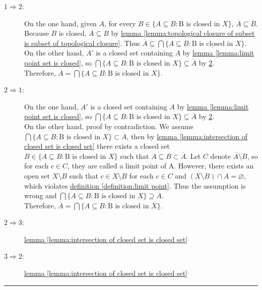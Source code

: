 \documentclass[12pt]{article}
\numberwithin{equation}{section}
\theoremstyle{plain} %
\theoremstyle{definition}
\theoremstyle{remark}
\newenvironment{proof}{{\bf Proof:}}{\hfill\rule{2mm}{2mm}}
\begin{document}
\begin{proof}
\begin{description}
	\item[$1 \Rightarrow 2$:] On the one hand, given $A$, for every $B \in \{A \subseteq B: \text{B is closed in }X\}$, $\overline{A} \subseteq \overline{B}$. Because $B$ is closed, $\overline{A} \subseteq {B}$ by \hyperref[lemma:topological closure of subset is subset of topological closure]{lemma \ref*{lemma:topological closure of subset is subset of topological closure}}. Thus $\overline{A} \subseteq \bigcap \{A \subseteq B: \text{B is closed in }X\}$. \\
	On the other hand, $A'$ is a closed set containing $A$ by \hyperref[lemma:limit point set is closed]{lemma \ref*{lemma:limit point set is closed}}, so $\bigcap \{A \subseteq B: \text{B is closed in }X\} \subseteq \overline{A}$ by \hyperref[definition:closure 2]{2}. \\
	Therefore, $\overline{A} = \bigcap \{A \subseteq B: \text{B is closed in }X\}$. 
	\item[$2 \Rightarrow 1$:] On the one hand, $A'$ is a closed set containing $A$ by \hyperref[lemma:limit point set is closed]{lemma \ref*{lemma:limit point set is closed}}, so $\bigcap \{A \subseteq B: \text{B is closed in }X\} \subseteq \overline{A}$ by \hyperref[definition:closure 2]{2}. \\
	On the other hand, proof by contradiction. We assume $\bigcap \{A \subseteq B: \text{B is closed in }X\} \subset \overline{A}$, then by \hyperref[lemma:intersection of closed set is closed set]{lemma \ref*{lemma:intersection of closed set is closed set}} there exists a closed set $B \in \{A \subseteq B: \text{B is closed in }X\}$ such that $A \subseteq B \subset \overline{A}$. Let $C$ denote $\overline{A} \setminus B$, so for each $c \in C$, they are called a limit point of A. However, there exists an open set $X \setminus B$ such that $c \in X \setminus B$ for each $c \in C$ and $(X \setminus B) \cap A = \varnothing$, which violates \hyperref[definition:limit point]{definition \ref*{definition:limit point}}. Thus the assumption is wrong and $\bigcap \{A \subseteq B: \text{B is closed in }X\} \supseteq \overline{A}$.\\
	Therefore, $\overline{A} = \bigcap \{A \subseteq B: \text{B is closed in }X\}$. 
	\item[$2 \Rightarrow 3$:] \hyperref[lemma:intersection of closed set is closed set]{lemma \ref*{lemma:intersection of closed set is closed set}} 
	\item[$3 \Rightarrow 2$:] \hyperref[lemma:intersection of closed set is closed set]{lemma \ref*{lemma:intersection of closed set is closed set}} 
\end{description}
\end{proof}
\end{document}
